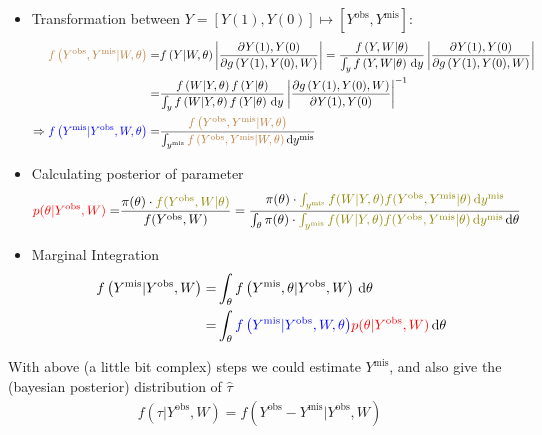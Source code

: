 \begin{itemize}[topsep=2pt,itemsep=0pt]
    \item Transformation between $ Y=[Y(1),Y(0)]\mapsto [Y^\mathrm{obs},Y^\mathrm{mis}  ] $:
    \begin{align*}
        {\color{brown}f\left(Y^\mathrm{obs},Y^\mathrm{mis}|W,\theta  \right)}=&f\left(Y|W,\theta \right) \left|\dfrac{\partial^{}Y(1),Y(0) }{\partial g\left(Y(1),Y(0),W\right)}\right|= \dfrac{f\left(Y,W|\theta \right)}{\int _y f\left(Y,W|\theta \right) \,\mathrm{d}y}  \left|\dfrac{\partial^{} Y(1),Y(0) }{\partial g\left(Y(1),Y(0),W\right)}\right|\\
        =& \dfrac{f\left(W|Y,\theta \right)f\left(Y|\theta \right)}{\int _y f\left(W|Y,\theta \right) f\left(Y|\theta \right) \,\mathrm{d}y}  \left|\dfrac{\partial g\left(Y(1),Y(0),W\right)}{\partial^{} Y(1),Y(0) }\right|^{-1}\\
        \Rightarrow {\color{blue}f\left(Y^\mathrm{mis}|Y^\mathrm{obs},W,\theta   \right)}=&\dfrac{{\color{brown}f\left(Y^\mathrm{obs},Y^\mathrm{mis}|W,\theta  \right)}}{\int _{y^\mathrm{mis} }{\color{brown}f\left(Y^\mathrm{obs},Y^\mathrm{mis}|W,\theta  \right) }\,\mathrm{d}y^\mathrm{mis} } 
    \end{align*}
    \item Calculating posterior of parameter
    \begin{align*}
         {\color{red}p(\theta |Y^\mathrm{obs},W )}=&\dfrac{\pi(\theta )\cdot {\color{olive}f(Y^\mathrm{obs},W|\theta  )}}{f(Y^\mathrm{obs},W )}=\dfrac{\pi(\theta )\cdot\color{olive} \int_{y^\mathrm{mis} } f(W|Y,\theta )f(Y^\mathrm{obs},Y^\mathrm{mis}|\theta   )\,\mathrm{d}y^\mathrm{mis}}{\int_{\theta }\pi(\theta )\cdot{\color{olive} \int_{y^\mathrm{mis} } f(W|Y,\theta )f(Y^\mathrm{obs},Y^\mathrm{mis}|\theta   )\,\mathrm{d}y^\mathrm{mis}} \,\mathrm{d}\theta  }
    \end{align*}
    \item Marginal Integration
    \begin{align*}
        f\left(Y^\mathrm{mis}|Y^\mathrm{obs},W  \right) =& \int _{\theta }f\left(Y^\mathrm{mis},\theta |Y^\mathrm{obs} ,W \right) \,\mathrm{d}\theta \\
        =& \int _{\theta  }{\color{blue}f\left(Y^\mathrm{mis}|Y^\mathrm{obs},W,\theta   \right)}{\color{red}p(\theta |Y^\mathrm{obs},W )} \,\mathrm{d}\theta 
    \end{align*}    
\end{itemize}

    With above (a little bit complex) steps we could estimate $ Y^\mathrm{mis}  $, and also give the (bayesian posterior) distribution of $ \hat{\tau} $
    \begin{align*}
        f({\tau|Y^\mathrm{obs},W })=f(Y^\mathrm{obs}- Y^\mathrm{mis}|Y^\mathrm{obs},W ) 
    \end{align*}
    
